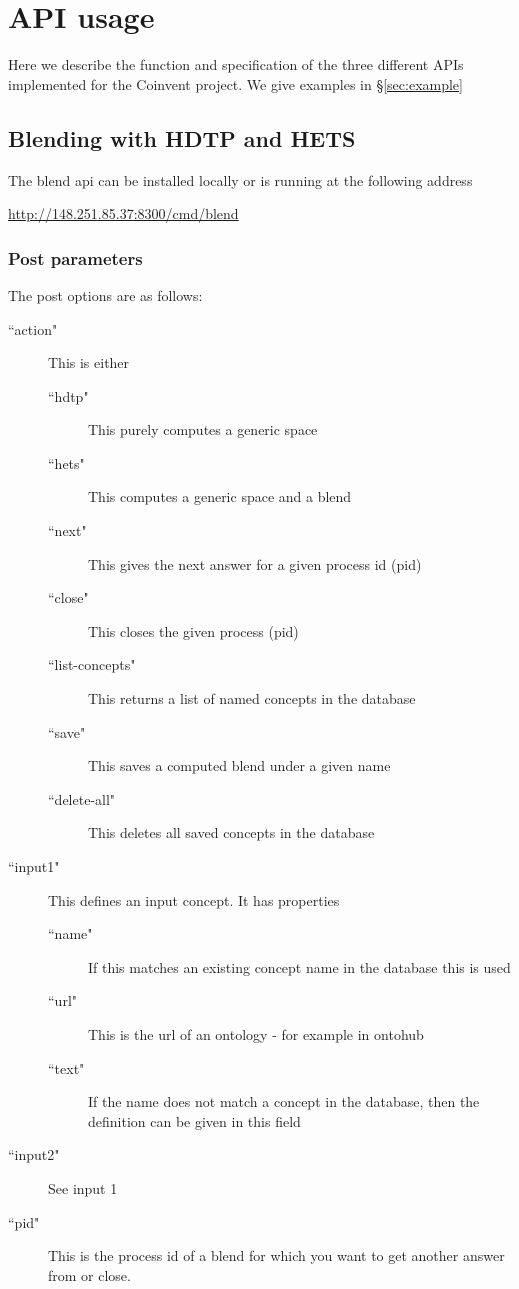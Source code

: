 \section{API usage}

Here we describe the function and specification of the three different APIs implemented for the Coinvent project. We give examples in \S\ref{sec:example}

\subsection{Blending with HDTP and HETS}



The blend api can be installed locally or is running at the following address
\begin{center}
\url{http://148.251.85.37:8300/cmd/blend}
\end{center}

\subsubsection{Post parameters}

The post options are as follows:
\begin{description}
\item[``action"]This is either
\begin{description}
\item[``hdtp"] This purely computes a generic space
\item[``hets"] This computes a generic space and a blend
\item[``next"] This gives the next answer for a given process id (pid)
\item[``close"] This closes the given process (pid)
\item[``list-concepts"] This returns a list of named concepts in the database
\item[``save"] This saves a computed blend under a given name
\item[``delete-all"] This deletes all saved concepts in the database
\end{description}
\item[``input1"] This defines an input concept. It has properties
\begin{description}
\item[``name"]  If this matches an existing concept name in the database this is used
\item[``url"]  This is the url of an ontology - for example in ontohub
\item[``text"]  If the name does not match a concept in the database, then the definition can be given in this field
\end{description}
\item[``input2"] See input 1
\item[``pid"] This is the process id of a blend for which you want to get another answer from or close.
\end{description}

